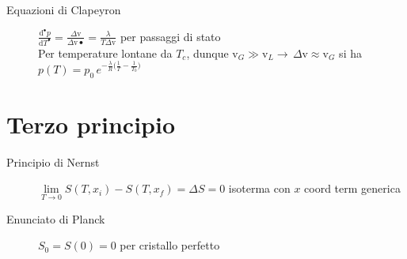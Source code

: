 \documentclass[10pt, oneside]{article}
\begin{document}
{}
\\~\\
\begin{description}
\item[Equazioni di Clapeyron] $\displaystyle \frac{\mathrm{d}^{•} p}{\mathrm{d}T^{•}} = \frac{\Delta \mathrm{v}}{\Delta \mathrm{v}•} = \frac{\lambda}{T \Delta \mathrm{v}}$ per passaggi di stato
\\Per temperature lontane da $T_c$, dunque $\mathrm{v}_G \gg \mathrm{v}_L \rightarrow \, \Delta \mathrm{v} \approx \mathrm{v}_G$ si ha $\boxed{\displaystyle p(T) = p_0 \, e^{\displaystyle - \frac{\lambda}{R} \big( \frac{1}{T} - \frac{1}{T_0}\big)}}$
\end{description}
\section{Terzo principio}
\begin{description}
\item[Principio di Nernst] $\displaystyle \lim\limits_{T \rightarrow 0} S(T, x_i) - S(T, x_f) = \Delta S = 0$ isoterma con $x$ coord term generica
\item[Enunciato di Planck] $\displaystyle S_0 = S(0) = 0$ per cristallo perfetto
\end{description}
\end{document}
